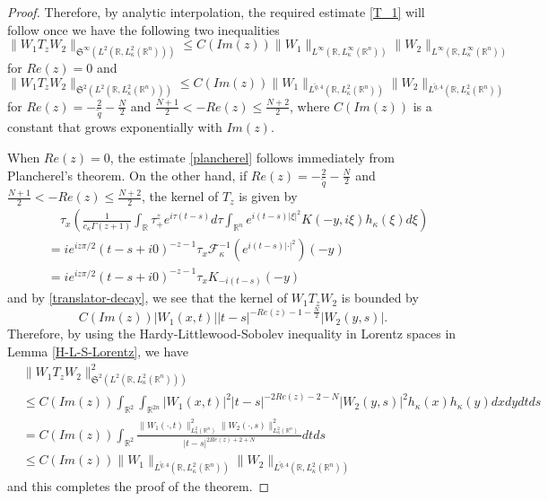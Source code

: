\documentclass[a4paper,11pt, reqno]{amsart}
\numberwithin{equation}{section}
\theoremstyle{plain}
\theoremstyle{definition}
\theoremstyle{remark}
\begin{document}
\begin{proof}
 Therefore, by analytic interpolation, the required estimate \eqref{T_1}  will follow once we have the following two inequalities
\begin{equation}\label{plancherel}
    \big\|W_1T_z W_2\big\|_{\mathfrak{S}^\infty(L^2(\mathbb{R}, L_\kappa^2(\mathbb{R}^n)))}\leq C(Im(z))\big\|W_1\big\|_{L^\infty(\mathbb{R}, L_\kappa^\infty(\mathbb{R}^n))}\big\|W_2\big\|_{L^\infty(\mathbb{R}, L_\kappa^\infty(\mathbb{R}^n))}
\end{equation}
for $Re(z)=0$ and
\begin{equation}\label{T_z}
     \big\|W_1T_z W_2\big\|_{\mathfrak{S}^2(L^2(\mathbb{R}, L_\kappa^2(\mathbb{R}^n)))}\leq C(Im(z))\big\|W_1\big\|_{L^{\tilde{q},4}(\mathbb{R}, L_\kappa^2(\mathbb{R}^n))}\big\|W_2\big\|_{L^{\tilde{q},4}(\mathbb{R}, L_\kappa^2(\mathbb{R}^n))}
\end{equation}
for $Re(z)=-\frac{2}{\tilde{q}}-\frac{N}{2}$ and $\frac{N+1}{2}<-Re(z)\leq \frac{N+2}{2}$, where $C(Im(z))$ is a constant that grows exponentially with $Im(z)$.

When $Re(z)=0$, the estimate  \eqref{plancherel} follows immediately from Plancherel's theorem. On the other hand, if $Re(z)=-\frac{2}{\tilde{q}}-\frac{N}{2}$ and $\frac{N+1}{2}<-Re(z)\leq\frac{N+2}{2}$, the kernel of $T_z$ is given by
\begin{align*}
    &\quad \tau_x\left(\frac{1}{c_\kappa\Gamma(z+1)}\int_{\mathbb{R}}\tau_+^ze^{i\tau (t-s)}d\tau\int_{\mathbb{R}^n} e^{i(t-s)|\xi|^2} K(-y,i \xi)h_\kappa(\xi)d\xi\right)\\
    &=ie^{iz \pi/2}(t-s+i0)^{-z-1}\tau_x \mathcal{F}^{-1}_\kappa (e^{i(t-s)|\cdot|^2} )(-y)\\
    &=ie^{iz \pi/2}(t-s+i0)^{-z-1}\tau_x K_{-i(t-s)}(-y)
\end{align*}
and by \eqref{translator-decay}, we see that the kernel of $W_1T_z W_2$ is bounded by
$$C(Im(z))|W_1(x,t)||t-s|^{-Re(z)-1-\frac{N}{2}}|W_2(y,s)|.$$
Therefore, by using the  Hardy-Littlewood-Sobolev inequality in Lorentz spaces in Lemma \ref{H-L-S-Lorentz}, we have
\begin{align*}
   &\big\|W_1T_z W_2\big\|^2_{\mathfrak{S}^2(L^2(\mathbb{R}, L_\kappa^2(\mathbb{R}^n)))}\\
   &\leq C(Im(z))\int_{\mathbb{R}^2}\int_{\mathbb{R}^{2n}} |W_1(x,t)|^2|t-s|^{-2Re(z)-2-N}|W_2(y,s)|^2h_\kappa(x)h_\kappa(y)dxdydtds\\
   &= C(Im(z))\int_{\mathbb{R}^2}\frac{\|W_1(\cdot,t)\|^2_{L_\kappa^2(\mathbb{R}^n)}\|W_2(\cdot,s)\|^2_{L_\kappa^2(\mathbb{R}^n)}}{|t-s|^{2Re(z)+2+N}}dtds\\
   &\leq C(Im(z))\big\|W_1\big\|_{L^{\tilde{q},4}(\mathbb{R}, L_\kappa^2(\mathbb{R}^n))}\big\|W_2\big\|_{L^{\tilde{q},4}(\mathbb{R}, L_\kappa^2(\mathbb{R}^n))}
\end{align*}
and this completes the proof of the theorem.  
\end{proof}
\end{document}
